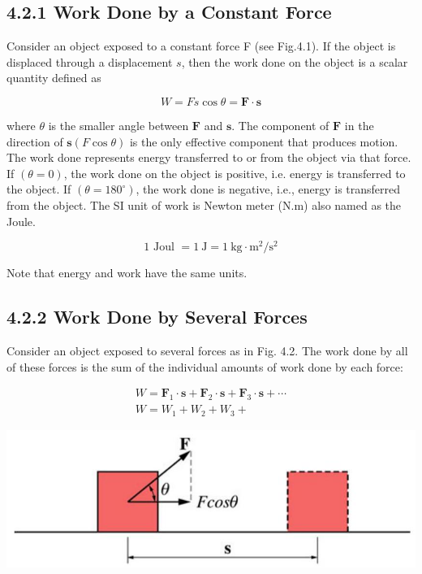 \documentclass[10pt]{article}
\begin{document}
\subsection*{4.2.1 Work Done by a Constant Force}
Consider an object exposed to a constant force F (see Fig.4.1). If the object is displaced through a displacement $s$, then the work done on the object is a scalar quantity defined as

$$
W=F s \cos \theta=\mathbf{F} \cdot \mathbf{s}
$$

where $\theta$ is the smaller angle between $\mathbf{F}$ and $\mathbf{s}$. The component of $\mathbf{F}$ in the direction of $\mathbf{s}(F \cos \theta)$ is the only effective component that produces motion. The work done represents energy transferred to or from the object via that force. If $(\theta=0)$, the work done on the object is positive, i.e. energy is transferred to the object. If $\left(\theta=180^{\circ}\right)$, the work done is negative, i.e., energy is transferred from the object. The SI unit of work is Newton meter (N.m) also named as the Joule.

$$
1 \text { Joul }=1 \mathrm{~J}=1 \mathrm{~kg} \cdot \mathrm{m}^{2} / \mathrm{s}^{2}
$$

Note that energy and work have the same units.

\subsection*{4.2.2 Work Done by Several Forces}
Consider an object exposed to several forces as in Fig. 4.2. The work done by all of these forces is the sum of the individual amounts of work done by each force:

$$
\begin{gathered}
W=\mathbf{F}_{1} \cdot \mathbf{s}+\mathbf{F}_{2} \cdot \mathbf{s}+\mathbf{F}_{3} \cdot \mathbf{s}+\cdots \\
W=W_{1}+W_{2}+W_{3}+
\end{gathered}
$$

\begin{center}
\includegraphics[max width=\textwidth]{2024_09_13_db1f357d2aad0a03eb2eg-063(1)}
\end{center}
\end{document}
